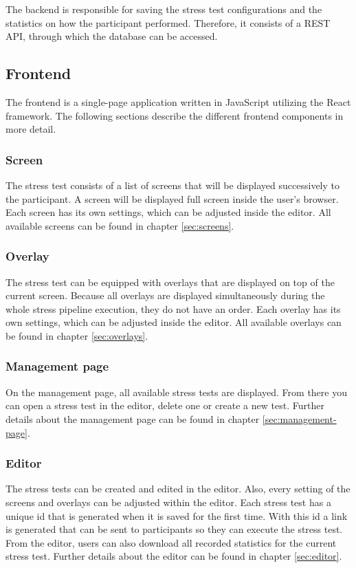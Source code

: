 The backend is responsible for saving the stress test configurations and the statistics on how the participant performed.
Therefore, it consists of a REST API, through which the database can be accessed.

\subsection{Frontend}
The frontend is a single-page application written in JavaScript utilizing the React framework. 
The following sections describe the different frontend components in more detail.

\subsubsection*{Screen}
The stress test consists of a list of screens that will be displayed successively to the participant. 
A screen will be displayed full screen inside the user's browser. 
Each screen has its own settings, which can be adjusted inside the editor. 
All available screens can be found in chapter \ref{sec:screens}.

\subsubsection*{Overlay}
The stress test can be equipped with overlays that are displayed on top of the current screen. 
Because all overlays are displayed simultaneously during the whole stress pipeline execution, they do not have an order. 
Each overlay has its own settings, which can be adjusted inside the editor.
All available overlays can be found in chapter \ref{sec:overlays}.

\subsubsection*{Management page}
On the management page, all available stress tests are displayed.
From there you can open a stress test in the editor, delete one or create a new test.
Further details about the management page can be found in chapter \ref{sec:management-page}.

\subsubsection*{Editor}
The stress tests can be created and edited in the editor.
Also, every setting of the screens and overlays can be adjusted within the editor.
Each stress test has a unique id that is generated when it is saved for the first time.
With this id a link is generated that can be sent to participants so they can execute the stress test.
From the editor, users can also download all recorded statistics for the current stress test.
Further details about the editor can be found in chapter \ref{sec:editor}.

